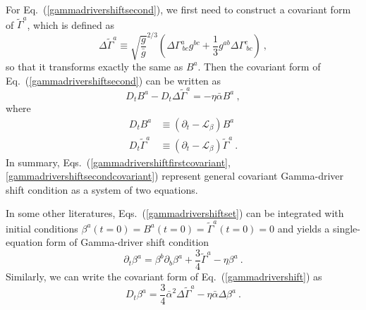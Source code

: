 For Eq.~(\ref{gammadrivershiftsecond}), we first need to construct a covariant form of ${\tilde \Gamma}^{a}$, which is defined as
\begin{equation}
\Delta {\tilde \Gamma}^{a} \equiv \sqrt{\frac{g}{{\bar g}}}^{2/3}\left(\Delta \Gamma^{a}_{~bc}g^{bc} + \frac{1}{3}g^{ab}\Delta \Gamma^{c}_{~bc}\right) \ ,
\end{equation}
so that it transforms exactly the same as $B^{a}$. Then the covariant form of Eq.~(\ref{gammadrivershiftsecond}) can be written as
\begin{equation}\label{gammadrivershiftsecondcovariant}
	D_{t}B^{a} - D_{t}\Delta {\tilde \Gamma}^{a}  = - \eta {\bar \alpha}B^{a} \ , 
\end{equation}
where
\begin{subequations}
\begin{align}
D_{t}B^{a} & \equiv \left(\partial_{t} - \mathcal{L}_{\beta}\right)B^{a}\\
D_{t}{\tilde \Gamma}^{a} & \equiv \left(\partial_{t} - \mathcal{L}_{\beta}\right){\tilde \Gamma}^{a} \ .
\end{align}
\end{subequations}
In summary, Eqs.~(\ref{gammadrivershiftfirstcovariant}, \ref{gammadrivershiftsecondcovariant}) represent general covariant Gamma-driver shift condition as a system of two equations. 

In some other literatures\cite{vanMeter:2006vi}, Eqs.~(\ref{gammadrivershiftset}) can be integrated with initial conditions $\beta^{a}\left(t=0\right) = B^{a}\left(t=0\right) = {\tilde \Gamma}^{a}\left(t = 0\right) = 0$ and yields a single-equation form of Gamma-driver shift condition
\begin{equation}\label{gammadrivershift}
\partial_{t}\beta^{a} = \beta^{b}\partial_{b}\beta^{a} + \frac{3}{4}{\tilde \Gamma}^{a} - \eta \beta^{a} \ .
\end{equation} 
Similarly, we can write the covariant form of Eq.~(\ref{gammadrivershift}) as
\begin{equation}\label{covariant Gamma-driver shift}
D_{t}\beta^{a} = \frac{3}{4}{\bar \alpha}^{2}\Delta {\tilde \Gamma}^{a} - \eta {\bar \alpha}\Delta\beta^{a} \ .
\end{equation}

